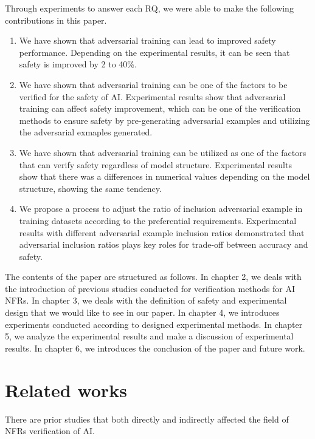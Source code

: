 \documentclass[journal,article,submit,moreauthors,pdftex]{Definitions/mdpi}
\begin{document}
Through experiments to answer each RQ, we were able to make the following contributions in this paper.

\begin{enumerate}
    \item	We have shown that adversarial training can lead to improved safety performance. Depending on the experimental results, it can be seen that safety is improved by 2 to 40\%.
    \item	We have shown that adversarial training can be one of the factors to be verified for the safety of AI. Experimental results show that adversarial training can affect safety improvement, which can be one of the verification methods to ensure safety by pre-generating adversarial examples and utilizing the adversarial exmaples generated.
    \item   We have shown that adversarial training can be utilized as one of the factors that can verify safety regardless of model structure. Experimental results show that there was a differences in numerical values depending on the model structure, showing the same tendency.
    \item	We propose a process to adjust the ratio of inclusion adversarial example in training datasets according to the preferential requirements. Experimental results with different adversarial example inclusion ratios demonstrated that adversarial inclusion ratios plays key roles for trade-off between accuracy and safety.
\end{enumerate} 

The contents of the paper are structured as follows. In chapter 2, we deals with the introduction of previous studies conducted for verification methods for AI NFRs.
In chapter 3, we deals with the definition of safety and experimental design that we would like to see in our paper.
In chapter 4, we introduces experiments conducted according to designed experimental methods.
In chapter 5, we analyze the experimental results and make a discussion of experimental results.
In chapter 6, we introduces the conclusion of the paper and future work.

\section{Related works}

There are prior studies that both directly and indirectly affected the field of NFRs verification of AI.
\end{document}
